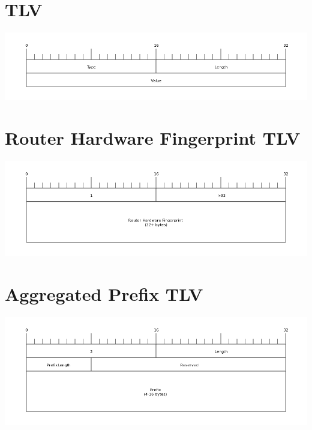 \section{TLV}
\label{TLV}
\begin{center}
	\includegraphics[width=\linewidth]{../Diagrams/Packets/tlv.png}
\end{center}

\section{Router Hardware Fingerprint TLV}
\begin{center}
	\includegraphics[width=\linewidth]{../Diagrams/Packets/rhwfp_tlv.png}
\end{center}

\section{Aggregated Prefix TLV}
\begin{center}
	\includegraphics[width=\linewidth]{../Diagrams/Packets/aggregated_prefix_tlv.png}
\end{center}

